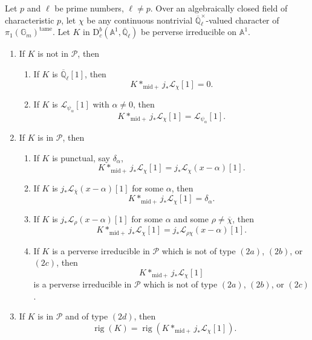 Let \(p\) and \(\ell\) be prime numbers, \(\ell\ne p\). Over an algebraically
closed field of characteristic \(p\), let \(\chi\) be any continuous nontrivial
\(\overline{\mathbb{Q}}_\ell^\times\)-valued character of
\(\pi_1(\mathbb{G}_m)^{\mathrm{tame}}\). Let \(K\) in
\(\mathrm{D}^b_c(\mathbb{A}^1,\overline{\mathbb{Q}}_\ell)\) be perverse
irreducible on \(\mathbb{A}^1\).
\begin{enumerate}[label=(\arabic*)]
\item If \(K\) is not in \(\mathcal{P}\), then
\begin{enumerate}[label=(1\alph*)]
\item If \(K\) is \(\overline{\mathbb{Q}}_\ell[1]\), then
\[
  K*_{\mathrm{mid}+}j_*\mathcal{L}_{\chi}[1]=0.
\]
\item If \(K\) is \(\mathcal{L}_{\psi_\alpha}[1]\) with \(\alpha\ne0\), then
\[
  K*_{\mathrm{mid}+}j_*\mathcal{L}_{\chi}[1]
  =
  \mathcal{L}_{\psi_\alpha}[1].
\]
\end{enumerate}
\item If \(K\) is in \(\mathcal{P}\), then
\begin{enumerate}[label=(2\alph*)]
\item If \(K\) is punctual, say \(\delta_\alpha\),
\[
  K*_{\mathrm{mid}+}j_*\mathcal{L}_{\chi}[1]
  =
  j_*\mathcal{L}_{\chi}(x-\alpha)[1].
\]
\item If \(K\) is \(j_*\mathcal{L}_{\overline{\chi}}(x-\alpha)[1]\) for some
\(\alpha\), then
\[
  K*_{\mathrm{mid}+}j_*\mathcal{L}_{\chi}[1]=\delta_\alpha.
\]
\item If \(K\) is \(j_*\mathcal{L}_{\rho}(x-\alpha)[1]\) for some \(\alpha\)
and some \(\rho\ne\overline{\chi}\), then
\[
  K*_{\mathrm{mid}+}j_*\mathcal{L}_{\chi}[1]
  =
  j_*\mathcal{L}_{\rho\chi}(x-\alpha)[1].
\]
\item If \(K\) is a perverse irreducible in \(\mathcal{P}\) which is not of
type \((2a)\), \((2b)\), or \((2c)\), then
\[
  K*_{\mathrm{mid}+}j_*\mathcal{L}_{\chi}[1]
\]
is a perverse irreducible in \(\mathcal{P}\) which is not of type \((2a)\),
\((2b)\), or \((2c)\).
\end{enumerate}
\item If \(K\) is in \(\mathcal{P}\) and of type \((2d)\), then
\[
  \operatorname{rig}(K)
  =
  \operatorname{rig}(K*_{\mathrm{mid}+}j_*\mathcal{L}_{\chi}[1]).
\]
\end{enumerate}

